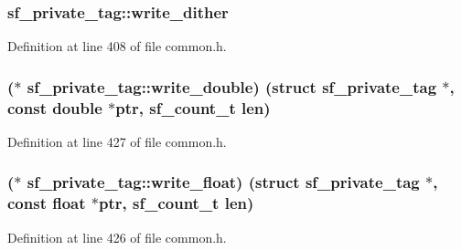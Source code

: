 \subsubsection[{\texorpdfstring{write\+\_\+dither}{write_dither}}]{ sf\+\_\+private\+\_\+tag\+::write\+\_\+dither}\hypertarget{structsf__private__tag_a3b1a270e31401beef1df0e11cfaed2c3}{}\label{structsf__private__tag_a3b1a270e31401beef1df0e11cfaed2c3}


Definition at line 408 of file common.\+h.

\subsubsection[{\texorpdfstring{write\+\_\+double}{write_double}}]{($\ast$ sf\+\_\+private\+\_\+tag\+::write\+\_\+double) (struct {\bf sf\+\_\+private\+\_\+tag} $\ast$, {\bf const} double $\ast$ptr, {\bf sf\+\_\+count\+\_\+t} {\bf len})}\hypertarget{structsf__private__tag_aad7738ff79d160943eeeaa8f4b551f37}{}\label{structsf__private__tag_aad7738ff79d160943eeeaa8f4b551f37}


Definition at line 427 of file common.\+h.

\subsubsection[{\texorpdfstring{write\+\_\+float}{write_float}}]{($\ast$ sf\+\_\+private\+\_\+tag\+::write\+\_\+float) (struct {\bf sf\+\_\+private\+\_\+tag} $\ast$, {\bf const} float $\ast$ptr, {\bf sf\+\_\+count\+\_\+t} {\bf len})}\hypertarget{structsf__private__tag_ac284efc7c4ba744880cf2d4d1c6fd85a}{}\label{structsf__private__tag_ac284efc7c4ba744880cf2d4d1c6fd85a}


Definition at line 426 of file common.\+h.

